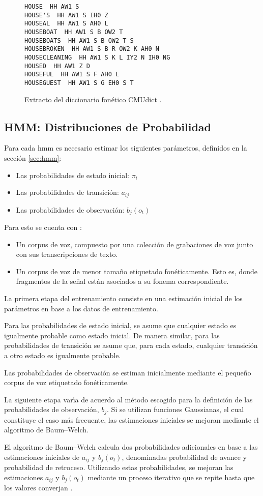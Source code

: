 \begin{figure}[H]
\begin{lstlisting}
HOUSE  HH AW1 S
HOUSE'S  HH AW1 S IH0 Z
HOUSEAL  HH AW1 S AH0 L
HOUSEBOAT  HH AW1 S B OW2 T
HOUSEBOATS  HH AW1 S B OW2 T S
HOUSEBROKEN  HH AW1 S B R OW2 K AH0 N
HOUSECLEANING  HH AW1 S K L IY2 N IH0 NG
HOUSED  HH AW1 Z D
HOUSEFUL  HH AW1 S F AH0 L
HOUSEGUEST  HH AW1 S G EH0 S T
\end{lstlisting}
\caption{Extracto del diccionario fon\'etico CMUdict \cite{CMUdict}.}
\end{figure}

\subsection{HMM: Distribuciones de Probabilidad}
Para cada \gls{hmm} es necesario estimar los siguientes par\'ametros, definidos en la secci\'on \ref{sec:hmm}:
	\begin{itemize}
		\item Las probabilidades de estado inicial: $\pi_i$
		\item Las probabilidades de transici\'on: $a_{ij}$
		\item Las probabilidades de observaci\'on: $b_j(o_t)$ 
	\end{itemize}

Para esto se cuenta con \cite{Jurafsky}:
	\begin{itemize}
		\item  Un corpus de voz, compuesto por una colecci\'on de grabaciones de voz junto
		con sus transcripciones de texto.
		\item Un corpus de voz de menor tama\~no etiquetado fon\'eticamente. 
		Esto es, donde fragmentos de la se\~nal est\'an asociados a su fonema correspondiente.
	\end{itemize}

La primera etapa del entrenamiento consiste en una estimaci\'on inicial de los par\'ametros en base a los
datos de entrenamiento.

Para las probabilidades de estado inicial, se asume que cualquier estado es igualmente probable 
como estado inicial. De manera similar, para las probabilidades de transici\'on se asume que, para cada estado, cualquier transici\'on a otro estado es igualmente probable.

Las probabilidades de observaci\'on se estiman inicialmente mediante el peque\~no corpus 
de voz etiquetado fon\'eticamente.

La siguiente etapa var{\'\i}a de acuerdo al m\'etodo escogido para la definici\'on de las probabilidades
de observaci\'on, $b_j$. Si se utilizan funciones Gaussianas, el cual constituye el caso m\'as
frecuente, las estimaciones iniciales se mejoran mediante el algoritmo de Baum--Welch.

El algoritmo de Baum--Welch calcula dos probabilidades adicionales en base a las estimaciones
iniciales de $a_{ij}$ y $b_j(o_t)$, denominadas probabilidad de avance y probabilidad de retroceso. 
Utilizando estas probabilidades, se mejoran las estimaciones $a_{ij}$ y $b_j(o_t)$ mediante
un proceso iterativo que se repite hasta que los valores converjan \cite{Rabiner89atutorial}.